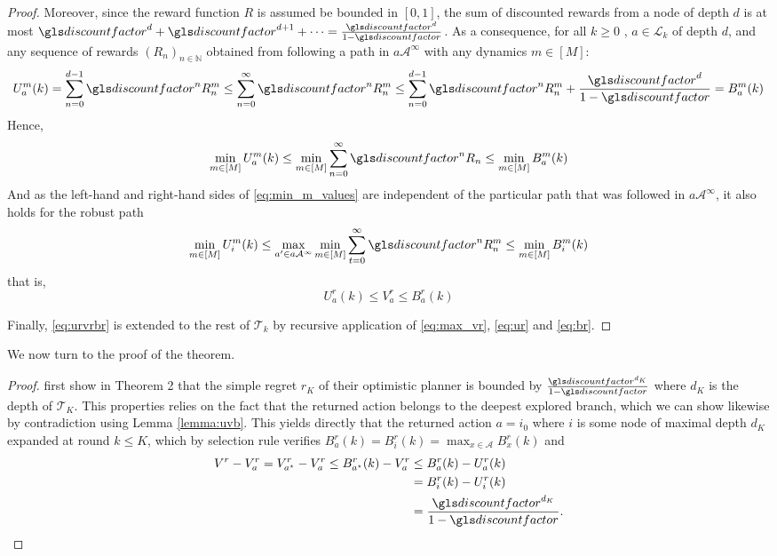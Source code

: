\begin{subappendices}
\begin{proof}
		Moreover, since the reward function $R$ is assumed be bounded in $[0, 1]$, the sum of discounted rewards from a node of depth $d$ is at most $\discount^d + \discount^{d+1}+\dots = \frac{\discount^d}{1-\discount}$. As a consequence, for all $k \geq 0$ , $a\in\mathcal{L}_k$ of depth $d$, and any sequence of rewards $(R_n)_{n\in\mathbb{N}}$ obtained from following a path in $a\mathcal{A}^\infty$ with any dynamics $m \in [M]$:
		\begin{equation*}
		U^m_a(k) = \sum_{n=0}^{d-1} \discount^n R_n^m \leq \sum_{n=0}^\infty \discount^n R_n^m \leq \sum_{n=0}^{d-1} \discount^n R_n^m + \frac{\discount^d}{1-\discount} = B^m_a(k) 
		\end{equation*}
		Hence,
		\begin{equation}
		\label{eq:min_m_values}
		\min_{m \in [M]} U^m_a(k) \leq \min_{m \in [M]} \sum_{n=0}^\infty \discount^n R_n \leq \min_{m \in [M]} B^m_a(k)
		\end{equation}
		And as the left-hand and right-hand sides of \eqref{eq:min_m_values} are independent of the particular path that was followed in $a\mathcal{A}^\infty$, it also holds for the robust path
		\begin{equation*}
		\min_{m \in [M]} U^m_i(k) \leq \max_{a'\in a\mathcal{A}^\infty} \min_{m \in [M]} \sum_{t=0}^\infty \discount^n R_n^m \leq \min_{m \in [M]} B^m_i(k)
		\end{equation*}
		that is,
		\begin{equation}
		\label{eq:urvrbr}
		U^r_a(k) \leq V^r_a  \leq B^r_a(k)
		\end{equation}
		
		Finally, \eqref{eq:urvrbr} is extended to the rest of $\mathcal{T}_k$ by recursive application of \eqref{eq:max_vr}, \eqref{eq:ur} and \eqref{eq:br}.
	\end{proof}
	
	We now turn to the proof of the theorem.
	
	\begin{proof}
		\citet{Hren2008} first show in Theorem 2 that the simple regret $r_K$ of their optimistic planner is bounded by $\frac{\discount^{d_K}}{1 - \discount}$ where $d_K$ is the depth of $\mathcal{T}_K$. This properties relies on the fact that the returned action belongs to the deepest explored branch, which we can show likewise by contradiction using Lemma \ref{lemma:uvb}. This yields directly that the returned action $a = i_0$ where $i$ is some node of maximal depth $d_K$ expanded at round $k\leq K$, which by selection rule verifies $B_a^r(k) = B_i^r(k) = \max_{x\in\mathcal{A}} B_x^r(k)$ and
		\begin{align*}
		\label{eq:Rndn}
		V^r - V_a^r = V_{a^{\star}}^r - V_a^r  \leq B_{a^{\star}}^r(k) - V_a^r &\leq B_{a}^r(k) - U_a^r(k) \\
		&= B_{i}^r(k) - U_i^r(k) \\
		&= \frac{\discount^{d_K}}{1-\discount}.
		\end{align*}
		

\end{proof}
\end{subappendices}
